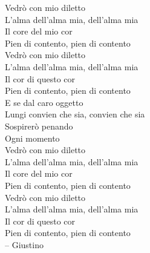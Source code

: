  \begin{dedication}
\hspace{6cm}Vedrò con mio diletto \\
\hspace{6cm}L'alma dell'alma mia, dell'alma mia  \\
\hspace{6cm}Il core del mio cor  \\
\hspace{6cm}Pien di contento, pien di contento  \\
\hspace{6cm}Vedrò con mio diletto \\
\hspace{6cm}L'alma dell'alma mia, dell'alma mia \\
\hspace{6cm}Il cor di questo cor \\
\hspace{6cm}Pien di contento, pien di contento \\
\hspace{6cm}E se dal caro oggetto \\
\hspace{6cm}Lungi convien che sia, convien che sia \\
\hspace{6cm}Sospirerò penando \\
\hspace{6cm}Ogni momento \\
\hspace{6cm}Vedrò con mio diletto \\
\hspace{6cm}L'alma dell'alma mia, dell'alma mia \\
\hspace{6cm}Il core del mio cor \\
\hspace{6cm}Pien di contento, pien di contento \\
\hspace{6cm}Vedrò con mio diletto \\
\hspace{6cm}L'alma dell'alma mia, dell'alma mia \\
\hspace{6cm}Il cor di questo cor \\
\hspace{6cm}Pien di contento, pien di contento \\
\hspace{10cm}-- Giustino
\end{dedication}

